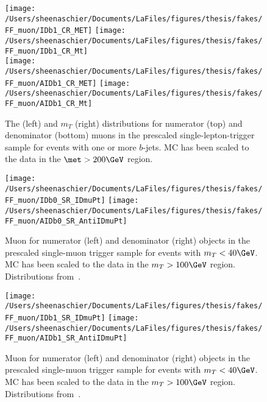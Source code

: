 \begin{figure}[tbp]
  \centering
  \texttt{[image: /Users/sheenaschier/Documents/LaFiles/figures/thesis/fakes/FF\_muon/IDb1\_CR\_MET]}
  \texttt{[image: /Users/sheenaschier/Documents/LaFiles/figures/thesis/fakes/FF\_muon/IDb1\_CR\_Mt]}\\
  \texttt{[image: /Users/sheenaschier/Documents/LaFiles/figures/thesis/fakes/FF\_muon/AIDb1\_CR\_MET]}
  \texttt{[image: /Users/sheenaschier/Documents/LaFiles/figures/thesis/fakes/FF\_muon/AIDb1\_CR\_Mt]}
  \caption{The \met{} (left) and $m_{T}$ (right) distributions for numerator (top) and denominator (bottom) muons in the prescaled single-lepton-trigger sample for events with one or more $b$-jets.  MC has been scaled to the data in the $\met > 200\GeV$ region.}
  \label{fig:muon_FF_dists_b1}
\end{figure}

\begin{figure}[tbp]
  \centering
  \texttt{[image: /Users/sheenaschier/Documents/LaFiles/figures/thesis/fakes/FF\_muon/IDb0\_SR\_IDmuPt]}
  \texttt{[image: /Users/sheenaschier/Documents/LaFiles/figures/thesis/fakes/FF\_muon/AIDb0\_SR\_AntiIDmuPt]}
  \caption{Muon \pt{} for numerator (left) and denominator (right) objects in the prescaled single-muon trigger sample for events with $m_{T} < 40\GeV$.  MC has been scaled to the data in the $m_{T} > 100\GeV$ region. Distributions from~\cite{Boerner:2231917}.}
  \label{fig:muon_FF_dists_pt_b0}
\end{figure}

\begin{figure}[tbp]
  \centering
  \texttt{[image: /Users/sheenaschier/Documents/LaFiles/figures/thesis/fakes/FF\_muon/IDb1\_SR\_IDmuPt]}
  \texttt{[image: /Users/sheenaschier/Documents/LaFiles/figures/thesis/fakes/FF\_muon/AIDb1\_SR\_AntiIDmuPt]}
  \caption{Muon \pt{} for numerator (left) and denominator (right) objects in the prescaled single-muon trigger sample for events with $m_{T}< 40\GeV$.  MC has been scaled to the data in the $m_{T} > 100\GeV$ region. Distributions from~\cite{Boerner:2231917}.}
  \label{fig:muon_FF_dists_pt_b1}
\end{figure}



